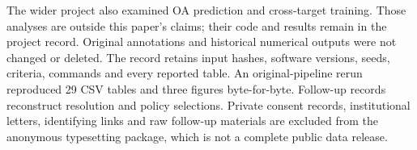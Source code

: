 The wider project also examined OA prediction and cross-target training. Those analyses are outside this paper's claims; their code and results remain in the project record. Original annotations and historical numerical outputs were not changed or deleted. The record retains input hashes, software versions, seeds, criteria, commands and every reported table. An original-pipeline rerun reproduced 29 CSV tables and three figures byte-for-byte. Follow-up records reconstruct resolution and policy selections. Private consent records, institutional letters, identifying links and raw follow-up materials are excluded from the anonymous typesetting package, which is not a complete public data release.
